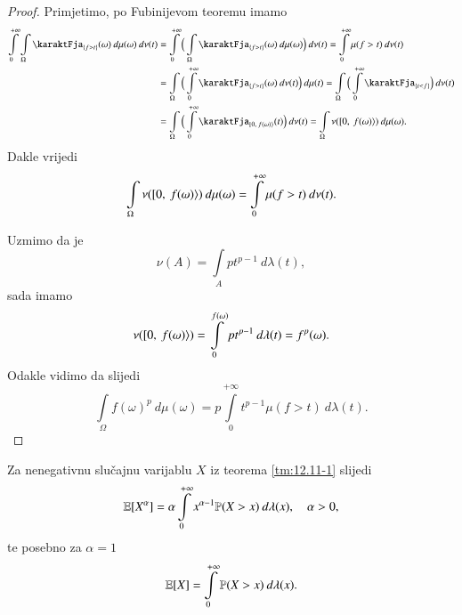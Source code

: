 \begin{proof}
    Primjetimo, po Fubinijevom teoremu imamo
    \begin{equation*}
        \begin{aligned}
            \int\limits_{0}^{+\infty} \int\limits_\Omega \karaktFja_{\{  f > t \}} (\omega)\: d \mu (\omega) \: d \nu (t) &= \int\limits_{0}^{+\infty} \Big( \int\limits_\Omega \karaktFja_{\{  f > t \}} (\omega) \: d \mu (\omega) \Big) \: d \nu (t) = \int\limits_{0}^{+\infty} \mu (f > t) \: d \nu (t)\\
            &= \int\limits_\Omega \Big( \int\limits_{0}^{+\infty} \karaktFja_{\{ f > t \}} (\omega) \: d \nu (t) \Big) \: d \mu (t) = \int\limits_\Omega \Big( \int\limits_{0}^{+\infty} \karaktFja_{\{ t < f \}} \Big) \: d \nu (t)\\
            &= \int\limits_\Omega \Big( \int\limits_{0}^{+\infty} \karaktFja_{\desInt{0}{f(\omega)}} (t) \Big) \: d \nu (t) = \int\limits_\Omega \nu (\desInt{0}{f (\omega)}) \: d \mu (\omega).
        \end{aligned}
    \end{equation*}
    Dakle vrijedi
    \begin{equation*}
        \int\limits_\Omega \nu ([ {0}, \: {f(\omega)} \rangle) \: d \mu (\omega) = \int\limits_{0}^{+\infty} \mu (f>t) \: d \nu (t).
    \end{equation*}

    Uzmimo da je
    \begin{equation*}
            \nu (A) = \int\limits_A p t^{p-1} \: d \lambda (t) ,
    \end{equation*}
    sada imamo
    \begin{equation*}
        \nu ([ {0}, \: {f(\omega)} \rangle) = \int\limits_{0}^{f(\omega)} p t^{p-1} \: d \lambda (t) = f^p (\omega).
    \end{equation*}
    Odakle vidimo da slijedi
    \begin{equation*}
        \int\limits_\Omega f(\omega)^p \: d \mu (\omega) = p \int\limits_{0}^{+\infty} t^{p-1} \mu (f > t) \: d \lambda (t).
    \end{equation*}
\end{proof}

\begin{nap} \label{nap:12.11-2}
    Za nenegativnu slu\v cajnu varijablu $X$ iz teorema \ref{tm:12.11-1} slijedi
    \begin{equation*}
        \mathbb{E} [X^\alpha] = \alpha \int\limits_{0}^{+\infty} x^{\alpha - 1} \mathbb{P} (X > x) \: d \lambda (x), \quad \alpha > 0,
    \end{equation*}
    te posebno za $\alpha = 1$
    \begin{equation*}
        \mathbb{E} [X] = \int\limits_{0}^{+\infty} \mathbb{P} (X > x) \: d \lambda (x).
    \end{equation*}
\end{nap}

